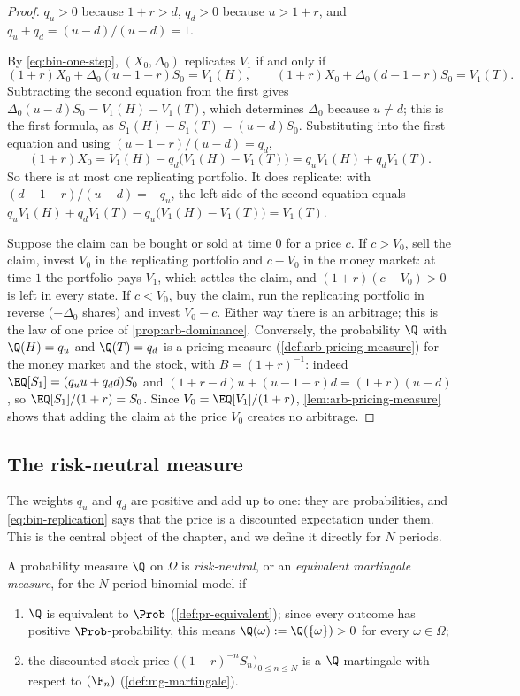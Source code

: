 \begin{proof}
$q_u>0$ because $1+r>d$, $q_d>0$ because $u>1+r$, and $q_u+q_d=(u-d)/(u-d)=1$.

By \eqref{eq:bin-one-step}, $(X_0,\Delta_0)$ replicates $V_1$ if and only if
\[
  (1+r)X_0+\Delta_0(u-1-r)S_0=V_1(H),\qquad (1+r)X_0+\Delta_0(d-1-r)S_0=V_1(T).
\]
Subtracting the second equation from the first gives $\Delta_0(u-d)S_0=V_1(H)-V_1(T)$,
which determines $\Delta_0$ because $u\ne d$; this is the first formula, as
$S_1(H)-S_1(T)=(u-d)S_0$. Substituting into the first equation and using
$(u-1-r)/(u-d)=q_d$,
\[
  (1+r)X_0=V_1(H)-q_d\big(V_1(H)-V_1(T)\big)=q_uV_1(H)+q_dV_1(T).
\]
So there is at most one replicating portfolio. It does replicate: with
$(d-1-r)/(u-d)=-q_u$, the left side of the second equation equals
$q_uV_1(H)+q_dV_1(T)-q_u\big(V_1(H)-V_1(T)\big)=V_1(T)$.

Suppose the claim can be bought or sold at time $0$ for a price $c$. If $c>V_0$, sell the
claim, invest $V_0$ in the replicating portfolio and $c-V_0$ in the money market: at time
$1$ the portfolio pays $V_1$, which settles the claim, and $(1+r)(c-V_0)>0$ is left in
every state. If $c<V_0$, buy the claim, run the replicating portfolio in reverse
($-\Delta_0$ shares) and invest $V_0-c$. Either way there is an arbitrage; this is the law
of one price of \cref{prop:arb-dominance}. Conversely, the probability $\Q$ with
$\Q(H)=q_u$ and $\Q(T)=q_d$ is a pricing measure (\cref{def:arb-pricing-measure}) for the
money market and the stock, with $B=(1+r)^{-1}$: indeed $\EQ[S_1]=(q_uu+q_dd)S_0$ and
$(1+r-d)u+(u-1-r)d=(1+r)(u-d)$, so $\EQ[S_1]/(1+r)=S_0$. Since $V_0=\EQ[V_1]/(1+r)$, \cref{lem:arb-pricing-measure} shows that
adding the claim at the price $V_0$ creates no arbitrage.
\end{proof}

\subsection{The risk-neutral measure}

The weights $q_u$ and $q_d$ are positive and add up to one: they are probabilities, and
\eqref{eq:bin-replication} says that the price is a discounted expectation under them.
This is the central object of the chapter, and we define it directly for $N$ periods.

\begin{definition}\label{def:bin-risk-neutral}
A probability measure $\Q$ on $\Omega$ is \emph{risk-neutral}, or an \emph{equivalent
martingale measure}, for the $N$-period binomial model if
\begin{enumerate}[label=(\roman*)]
  \item $\Q$ is equivalent to $\Prob$ (\cref{def:pr-equivalent}); since every outcome has
    positive $\Prob$-probability, this means $\Q(\omega):=\Q(\{\omega\})>0$ for every
    $\omega\in\Omega$;
  \item the discounted stock price $\big((1+r)^{-n}S_n\big)_{0\le n\le N}$ is a
    $\Q$-martingale with respect to $(\F_n)$ (\cref{def:mg-martingale}).
\end{enumerate}
\end{definition}

